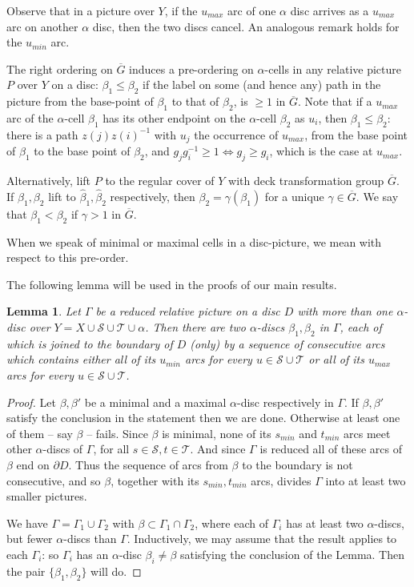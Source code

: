 \documentclass[12pt,a4paper]{amsart}
\def\ol{\overline}
\def\wh{\widehat}
\def\G{\Gamma}
\def\a{\alpha}
\def\b{\beta}
\def\cS{\mathcal{S}}
\def\cT{\mathcal{T}}
\newtheorem{lem}[thm]{Lemma}
\begin{document}
Observe that in a picture over $Y$, if the $u_{max}$ arc of one $\alpha$ disc arrives as a $u_{max}$ arc on 
another $\alpha$ disc, then the two discs cancel.   
An analogous remark holds for the $u_{min}$ arc.


The right ordering on $\ol G$  induces a pre-ordering on $\a$-cells 
in any 
relative  picture $P$ over $Y$ 
 on a disc:  
$\b_1\le\b_2$ if the label on some (and hence any) path in the picture  
from the base-point of $\b_1$ to that of $\b_2$,  is $\ge 1$ in $\ol{G}$.
Note that if a $u_{max}$  arc of the $\a$-cell $\beta_1$ has its other endpoint on the
$\a$-cell $\beta_2$ as $u_i$, then  $\beta_1 \le \beta_2$:
there is a path $z(j)z(i)^{-1}$ with $u_j$ the occurrence of $u_{max}$, 
from the base point of $\beta_1$ to the base point of $\beta_2$, and 
$g_{j} g_i^{-1} \ge 1 \iff g_j \ge  g_i$, which is the case at $u_{max}$.

Alternatively, lift $P$ to the regular cover of $Y$ with deck transformation group $\ol{G}$. If $\b_1,\b_2$ lift to $\wh\b_1,\wh\b_2$ respectively, then $\b_2=\gamma(\b_1)$ for a unique $\gamma\in\ol G$.  We say that $\b_1<\b_2$ if $\gamma>1$ in $\ol G$.  

When we speak of minimal or maximal cells in a 
disc-picture, we mean with respect to this pre-order.    
	
	
\smallskip
	The following lemma will be used in the proofs  of   our main results.

\begin{lem}\label{l:1}
	Let $\G$ be a reduced relative picture   on a disc $D$
	with more than one   $\a$-disc 
	over $Y = X\cup \cS\cup\cT\cup\alpha$. 
	Then there are two  $\a$-discs 
	$\b_1,\b_2$ in $\G$, each of which   is joined to the boundary of $D$ (only)  
	by a sequence of consecutive arcs 
	which contains 
	either all of its $u_{min}$   arcs   for every $u\in\cS\cup\cT$  
	or all of its $u_{max}$  arcs for every $u\in\cS\cup\cT$.  
\end{lem}

\begin{proof}
	Let $\b,\b'$ be a minimal and a maximal $\a$-disc 
	respectively in $\G$.  
	If $\b,\b'$ satisfy the conclusion in the statement then we are done.  
	Otherwise at least one of them -- say $\b$ -- fails.   
	Since $\b$ is minimal, 
 none of its $s_{min}$ and $t_{min}$ arcs meet other $\a$-discs of $\G$,
	for all $s\in\cS, t\in\cT$.   
	And since $\G$ is reduced all of these arcs of $\b$ end on $\partial D$.
	Thus the sequence of arcs from $\b$ to the boundary is not consecutive, 
	and so  
		$\b$, together with its $s_{min},t_{min}$ arcs, divides $\G$ into at least two smaller  pictures.

	
	We have $\G=\G_1\cup\G_2$ with $\b\subset\G_1\cap\G_2$, where each of $\G_i$ has at least two $\a$-discs, but   fewer $\a$-discs than $\G$.  
	Inductively, we may assume that the result applies to each $\G_i$: 
	so $\G_i$ has an $\a$-disc  
	$\b_i\ne\b$ satisfying the conclusion of the Lemma.  
	Then the pair $\{\b_1,\b_2\}$ will do.
\end{proof}
\end{document}
